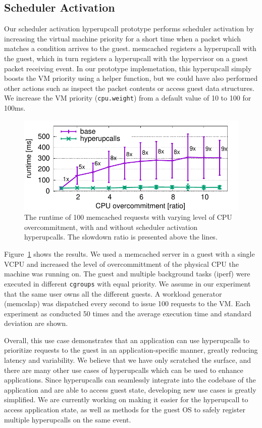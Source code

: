 \documentclass[11pt]{article}
\begin{document}
\subsection{Scheduler Activation}
Our scheduler activation hyperupcall prototype performs scheduler activation by increasing the virtual
machine priority for a short time when a packet which matches a condition arrives
to the guest. memcached registers a hyperupcall with the guest, which in turn registers a
hyperupcall with the hypervisor on a guest packet receiving event. In our prototype implemetation, 
this hyperupcall simply boosts the VM priority using a helper function, but we could have
also performed other actions such as inspect the packet contents or access guest data structures.
We increase the VM priority (\texttt{cpu.weight}) from a default value of 10 to 100 for 100ms.


\begin{figure}
	\includegraphics[width=\textwidth]{figs/memcached_sched-eps-converted-to.pdf}
	\caption{The runtime of 100 memcached requests with varying
	level of CPU overcommitment, with and without scheduler activation
	hyperupcalls. The slowdown ratio is presented above the lines.}
	\label{fig:sched}
\end{figure}

Figure~\ref{fig:sched} shows the results. We used a memcached server in a guest with a single VCPU
and increased the level of overcommittment of the physical CPU the machine was running on.
The guest and multiple background tasks (iperf)
were executed in different \texttt{cgroups} with equal priority. We assume
in our experiment that the same user owns all the different guests. A workload generator (memcslap) was dispatched every second to issue 100 requests to the VM.
Each experiment as conducted 50 times and the average execution time and standard deviation are shown.

Overall, this use case demonstrates that an application can use hyperupcalls to prioritize requests to the
guest in an application-specific manner, greatly reducing latency and variability. We believe that we have
only scratched the surface, and there are many other use cases of hyperupcalls which can be used to enhance
applications. Since hyperupcalls can seamlessly integrate into the codebase of the application and are able to
access guest state, developing new use cases is greatly simplified. We are currently working on making
it easier for the hyperupcall to access application state, as well as methods for the guest OS to safely
register multiple hyperupcalls on the same event.
\end{document}
